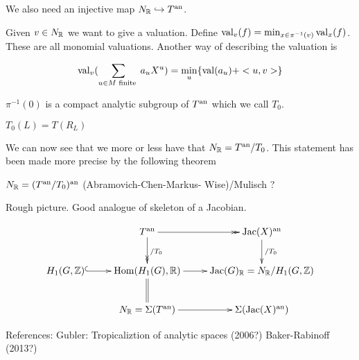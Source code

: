 \noindent We also need an injective map $N_{\mathbb{R}}\hookrightarrow T^{\mathrm{an}}$. 

Given $v\in N_{\mathbb{R}}$ we want to give a valuation. Define $\mathrm{val}_v(f) = \min_{x\in \pi^{-1}(v)}\mathrm{val}_x(f)$.
\noindent These are all monomial valuations. Another way of describing the valuation is 

\[\mathrm{val}_v(\sum_{u\in M \text{ finite }}a_{u}X^u) = \min_u\{\mathrm{val}(a_u)+<u,v>\}\]

$\pi^{-1}(0)$ is a compact analytic subgroup of $T^{\mathrm{an}}$ which we call $T_0$. 

$T_0(L) = T(R_L)$

\noindent We can now see that we more or less have that $N_{\mathbb{R}} = T^{\mathrm{an}}/T_0$. This statement has been made more precise by the following theorem

\begin{theorem} $N_{\mathbb{R}} = (T^{\mathrm{an}}/T_0)^{\mathrm{an}}$ (Abramovich-Chen-Markus- Wise)/Mulisch ?

\noindent Rough picture. Good analogue of skeleton of a Jacobian.

\end{theorem}
 
\[
\xymatrix{
 & T^{\an} \ar@{->>}[r] \ar@{->>}[d]^{/T_0} & \Jac(X)^{\an} \ar[d]^{/T_0} \\
H_1(G,\ZZ) \ar@{^{(}->}[r] & \Hom(H_1(G),\RR) \ar[r] \ar@{=}[d] & \Jac(G)_{\RR} = N_{\RR}/H_1(G,\ZZ) \\
 & N_{\RR} = \Sigma(T^{\an}) \ar[r] & \Sigma(\Jac(X)^{\an}) 
 }
\]

References: 
Gubler: Tropicaliztion of analytic spaces (2006?)
Baker-Rabinoff (2013?)